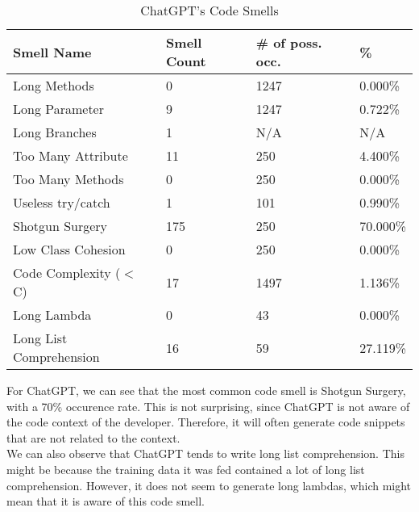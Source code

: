\begin{table}[!ht]
    \centering
    \caption{ChatGPT's Code Smells}
    \begin{tabular}{llll}
        \hline
        \textbf{Smell Name}     & \textbf{Smell Count} & \textbf{\# of poss. occ.} & \textbf{\%} \\ \hline
        Long Methods            & 0                    & 1247                      & 0.000\%     \\
        Long Parameter          & 9                    & 1247                      & 0.722\%     \\
        Long Branches           & 1                    & N/A                       & N/A         \\
        Too Many Attribute      & 11                   & 250                       & 4.400\%     \\
        Too Many Methods        & 0                    & 250                       & 0.000\%     \\
        Useless try/catch       & 1                    & 101                       & 0.990\%     \\
        Shotgun Surgery         & 175                  & 250                       & 70.000\%    \\
        Low Class Cohesion      & 0                    & 250                       & 0.000\%     \\
        Code Complexity ($<$ C) & 17                   & 1497                      & 1.136\%     \\
        Long Lambda             & 0                    & 43                        & 0.000\%     \\
        Long List Comprehension & 16                   & 59                        & 27.119\%    \\ \hline
    \end{tabular}
    \label{table:result-chatgpt}
\end{table}

For ChatGPT, we can see that the most common code smell is Shotgun Surgery, with a 70\% occurence rate. This is not surprising, since ChatGPT is not aware of the code context of the developer. Therefore, it will often generate code snippets that are not related to the context. \\

We can also observe that ChatGPT tends to write long list comprehension. This might be because the training data it was fed contained a lot of long list comprehension. However, it does not seem to generate long lambdas, which might mean that it is aware of this code smell. \\

